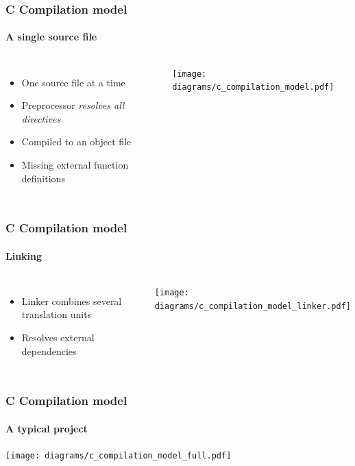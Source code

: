 \documentclass{beamer}
\begin{document}
\begin{frame}
\end{frame}

\begin{frame}
    \frametitle{C Compilation model}
    \framesubtitle{A single source file}
    \begin{columns}[t]
        \column{4cm}
        \begin{itemize}
            \item One source file at a time
            \item Preprocessor \emph{resolves all directives}
            \item Compiled to an object file
            \item Missing external function definitions
        \end{itemize}
        \column[T]{8cm}
        \texttt{[image: diagrams/c\_compilation\_model.pdf]}
    \end{columns}
\end{frame}

\begin{frame}
    \frametitle{C Compilation model}
    \framesubtitle{Linking}
    \begin{columns}[t]
        \column{4cm}
        \begin{itemize}
            \item Linker combines several translation units
            \item Resolves external dependencies
        \end{itemize}
        \column[T]{8cm}
        \texttt{[image: diagrams/c\_compilation\_model\_linker.pdf]}
    \end{columns}
\end{frame}

\begin{frame}
    \frametitle{C Compilation model}
    \framesubtitle{A typical project}
    \texttt{[image: diagrams/c\_compilation\_model\_full.pdf]}
\end{frame}
\end{document}
